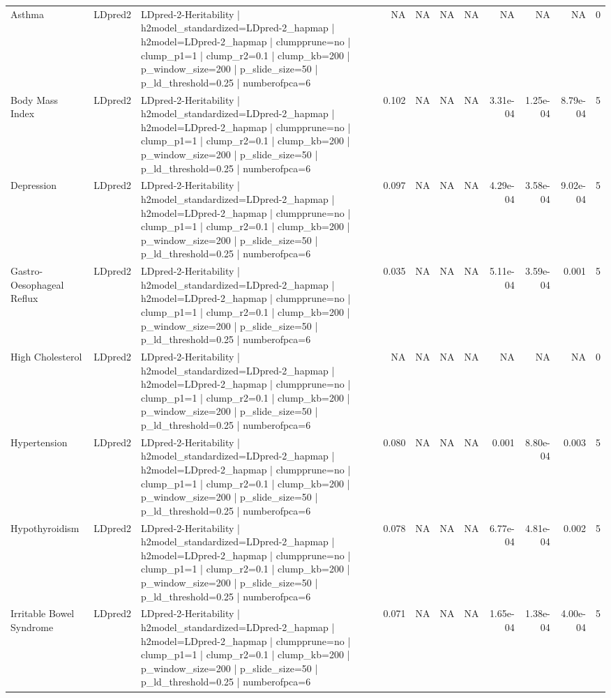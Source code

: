 \begin{landscape}
\begin{longtable}{p{2.4cm}p{1.8cm}p{6.0cm}rrrrrrrr}
Asthma & LDpred2 & LDpred-2-Heritability | h2model\_standardized=LDpred-2\_hapmap | h2model=LDpred-2\_hapmap | clumpprune=no | clump\_p1=1 | clump\_r2=0.1 | clump\_kb=200 | p\_window\_size=200 | p\_slide\_size=50 | p\_ld\_threshold=0.25 | numberofpca=6 & NA & NA & NA & NA & NA & NA & NA & 0 \\
Body Mass Index & LDpred2 & LDpred-2-Heritability | h2model\_standardized=LDpred-2\_hapmap | h2model=LDpred-2\_hapmap | clumpprune=no | clump\_p1=1 | clump\_r2=0.1 | clump\_kb=200 | p\_window\_size=200 | p\_slide\_size=50 | p\_ld\_threshold=0.25 | numberofpca=6 & 0.102 & NA & NA & NA & 3.31e-04 & 1.25e-04 & 8.79e-04 & 5 \\
Depression & LDpred2 & LDpred-2-Heritability | h2model\_standardized=LDpred-2\_hapmap | h2model=LDpred-2\_hapmap | clumpprune=no | clump\_p1=1 | clump\_r2=0.1 | clump\_kb=200 | p\_window\_size=200 | p\_slide\_size=50 | p\_ld\_threshold=0.25 | numberofpca=6 & 0.097 & NA & NA & NA & 4.29e-04 & 3.58e-04 & 9.02e-04 & 5 \\
Gastro-Oesophageal Reflux & LDpred2 & LDpred-2-Heritability | h2model\_standardized=LDpred-2\_hapmap | h2model=LDpred-2\_hapmap | clumpprune=no | clump\_p1=1 | clump\_r2=0.1 | clump\_kb=200 | p\_window\_size=200 | p\_slide\_size=50 | p\_ld\_threshold=0.25 | numberofpca=6 & 0.035 & NA & NA & NA & 5.11e-04 & 3.59e-04 & 0.001 & 5 \\
High Cholesterol & LDpred2 & LDpred-2-Heritability | h2model\_standardized=LDpred-2\_hapmap | h2model=LDpred-2\_hapmap | clumpprune=no | clump\_p1=1 | clump\_r2=0.1 | clump\_kb=200 | p\_window\_size=200 | p\_slide\_size=50 | p\_ld\_threshold=0.25 | numberofpca=6 & NA & NA & NA & NA & NA & NA & NA & 0 \\
Hypertension & LDpred2 & LDpred-2-Heritability | h2model\_standardized=LDpred-2\_hapmap | h2model=LDpred-2\_hapmap | clumpprune=no | clump\_p1=1 | clump\_r2=0.1 | clump\_kb=200 | p\_window\_size=200 | p\_slide\_size=50 | p\_ld\_threshold=0.25 | numberofpca=6 & 0.080 & NA & NA & NA & 0.001 & 8.80e-04 & 0.003 & 5 \\
Hypothyroidism & LDpred2 & LDpred-2-Heritability | h2model\_standardized=LDpred-2\_hapmap | h2model=LDpred-2\_hapmap | clumpprune=no | clump\_p1=1 | clump\_r2=0.1 | clump\_kb=200 | p\_window\_size=200 | p\_slide\_size=50 | p\_ld\_threshold=0.25 | numberofpca=6 & 0.078 & NA & NA & NA & 6.77e-04 & 4.81e-04 & 0.002 & 5 \\
Irritable Bowel Syndrome & LDpred2 & LDpred-2-Heritability | h2model\_standardized=LDpred-2\_hapmap | h2model=LDpred-2\_hapmap | clumpprune=no | clump\_p1=1 | clump\_r2=0.1 | clump\_kb=200 | p\_window\_size=200 | p\_slide\_size=50 | p\_ld\_threshold=0.25 | numberofpca=6 & 0.071 & NA & NA & NA & 1.65e-04 & 1.38e-04 & 4.00e-04 & 5 \\

\end{longtable}
\end{landscape}
